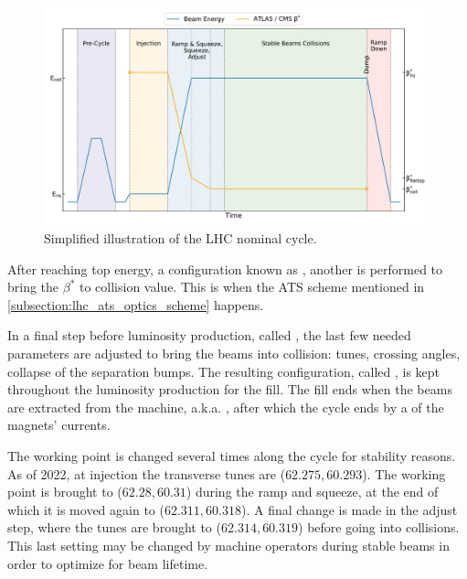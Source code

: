 \begin{figure}[!hbt]
  \centering
  \includegraphics*[width=0.99\linewidth]{Figures/Optics_Measurements_Corrections_at_LHC/lhc_cycle.pdf}
  \caption{Simplified illustration of the LHC nominal cycle.}
  \label{figure:lhc_cycle}
\end{figure}

After reaching top energy, a configuration known as , another  is performed to bring the \(\beta^{\ast}\) to collision value.
This is when the ATS scheme mentioned in \cref{subsection:lhc_ats_optics_scheme} happens.

In a final step before luminosity production, called , the last few needed parameters are adjusted to bring the beams into collision: tunes, crossing angles, collapse of the separation bumps.
The resulting configuration, called , is kept throughout the luminosity production for the fill.
The fill ends when the beams are extracted from the machine, a.k.a. , after which the cycle ends by a  of the magnets' currents.

The working point is changed several times along the cycle for stability reasons.
As of \num{2022}, at injection the transverse tunes are (\(62.275, 60.293\)).
The working point is brought to (\(62.28, 60.31\)) during the ramp and squeeze, at the end of which it is moved again to (\(62.311, 60.318\)).
A final change is made in the adjust step, where the tunes are brought to (\(62.314, 60.319\)) before going into collisions.
This last setting may be changed by machine operators during stable beams in order to optimize for beam lifetime.

